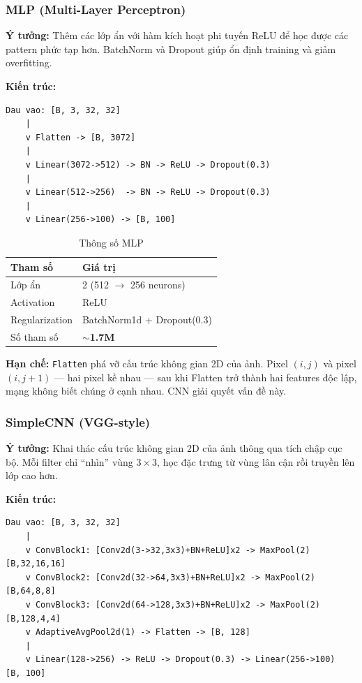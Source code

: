 \documentclass[12pt, a4paper]{article}
\begin{document}
\subsubsection{MLP (Multi-Layer Perceptron)}

\textbf{Ý tưởng:} Thêm các lớp ẩn với hàm kích hoạt phi tuyến ReLU để học được các pattern phức tạp hơn. BatchNorm và Dropout giúp ổn định training và giảm overfitting.

\textbf{Kiến trúc:}
\begin{lstlisting}[style=plainstyle]
Dau vao: [B, 3, 32, 32]
    |
    v Flatten -> [B, 3072]
    |
    v Linear(3072->512) -> BN -> ReLU -> Dropout(0.3)
    |
    v Linear(512->256)  -> BN -> ReLU -> Dropout(0.3)
    |
    v Linear(256->100) -> [B, 100]
\end{lstlisting}

\begin{table}[H]
\centering
\caption{Thông số MLP}
\begin{tabular}{ll}
\toprule
\textbf{Tham số} & \textbf{Giá trị} \\
\midrule
Lớp ẩn         & 2 (512 $\rightarrow$ 256 neurons) \\
Activation     & ReLU \\
Regularization & BatchNorm1d + Dropout(0.3) \\
Số tham số     & $\sim$\textbf{1.7M} \\
\bottomrule
\end{tabular}
\end{table}

\textbf{Hạn chế:} \texttt{Flatten} phá vỡ cấu trúc không gian 2D của ảnh. Pixel $(i, j)$ và pixel $(i, j+1)$ --- hai pixel kề nhau --- sau khi Flatten trở thành hai features độc lập, mạng không biết chúng ở cạnh nhau. CNN giải quyết vấn đề này.

\subsubsection{SimpleCNN (VGG-style)}

\textbf{Ý tưởng:} Khai thác cấu trúc không gian 2D của ảnh thông qua tích chập cục bộ. Mỗi filter chỉ ``nhìn'' vùng $3\times3$, học đặc trưng từ vùng lân cận rồi truyền lên lớp cao hơn.

\textbf{Kiến trúc:}
\begin{lstlisting}[style=plainstyle]
Dau vao: [B, 3, 32, 32]
    |
    v ConvBlock1: [Conv2d(3->32,3x3)+BN+ReLU]x2 -> MaxPool(2) [B,32,16,16]
    v ConvBlock2: [Conv2d(32->64,3x3)+BN+ReLU]x2 -> MaxPool(2) [B,64,8,8]
    v ConvBlock3: [Conv2d(64->128,3x3)+BN+ReLU]x2 -> MaxPool(2) [B,128,4,4]
    v AdaptiveAvgPool2d(1) -> Flatten -> [B, 128]
    |
    v Linear(128->256) -> ReLU -> Dropout(0.3) -> Linear(256->100)
[B, 100]
\end{lstlisting}
\end{document}
